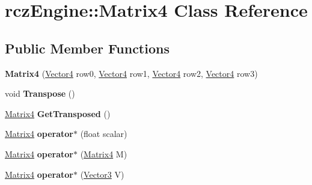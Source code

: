 \hypertarget{classrcz_engine_1_1_matrix4}{}\section{rcz\+Engine\+:\+:Matrix4 Class Reference}
\label{classrcz_engine_1_1_matrix4}
\subsection*{Public Member Functions}
\begin{DoxyCompactItemize}
\item 
\hypertarget{classrcz_engine_1_1_matrix4_a782e8b49d4ff588d1ddd0fe364e09301}{}{\bfseries Matrix4} (\hyperlink{classrcz_engine_1_1_vector4}{Vector4} row0, \hyperlink{classrcz_engine_1_1_vector4}{Vector4} row1, \hyperlink{classrcz_engine_1_1_vector4}{Vector4} row2, \hyperlink{classrcz_engine_1_1_vector4}{Vector4} row3)\label{classrcz_engine_1_1_matrix4_a782e8b49d4ff588d1ddd0fe364e09301}

\item 
\hypertarget{classrcz_engine_1_1_matrix4_a2cc6dd6b978a4b864e4e2e4ca2b1558f}{}void {\bfseries Transpose} ()\label{classrcz_engine_1_1_matrix4_a2cc6dd6b978a4b864e4e2e4ca2b1558f}

\item 
\hypertarget{classrcz_engine_1_1_matrix4_a8c99457ffc3e7e9999c93a376fe812ea}{}\hyperlink{classrcz_engine_1_1_matrix4}{Matrix4} {\bfseries Get\+Transposed} ()\label{classrcz_engine_1_1_matrix4_a8c99457ffc3e7e9999c93a376fe812ea}

\item 
\hypertarget{classrcz_engine_1_1_matrix4_a33411e72b53bffb58fa2b9e535ea4416}{}\hyperlink{classrcz_engine_1_1_matrix4}{Matrix4} {\bfseries operator$\ast$} (float scalar)\label{classrcz_engine_1_1_matrix4_a33411e72b53bffb58fa2b9e535ea4416}

\item 
\hypertarget{classrcz_engine_1_1_matrix4_a8831033d289aeaf3d6107f439c3742b2}{}\hyperlink{classrcz_engine_1_1_matrix4}{Matrix4} {\bfseries operator$\ast$} (\hyperlink{classrcz_engine_1_1_matrix4}{Matrix4} M)\label{classrcz_engine_1_1_matrix4_a8831033d289aeaf3d6107f439c3742b2}

\item 
\hypertarget{classrcz_engine_1_1_matrix4_a8c31a0809f380066fc4ec3f5ef993acb}{}\hyperlink{classrcz_engine_1_1_matrix4}{Matrix4} {\bfseries operator$\ast$} (\hyperlink{classrcz_engine_1_1_vector3}{Vector3} V)\label{classrcz_engine_1_1_matrix4_a8c31a0809f380066fc4ec3f5ef993acb}


\end{DoxyCompactItemize}
